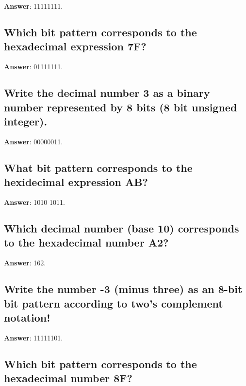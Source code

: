 \documentclass[a4paper,11pt,oneside]{article}
\begin{document}
\begin{sloppypar}
\label{q:358:sa:en:True}

\textbf{Answer}: 11111111.



\subsection{Which bit pattern corresponds to the hexadecimal expression 7F?}

\label{q:359:sa:en:True}

\textbf{Answer}: 01111111.



\subsection{Write the decimal number 3 as a binary number represented by 8 bits (8 bit unsigned integer).}

\label{q:360:sa:en:True}

\textbf{Answer}: 00000011.



\subsection{What bit pattern corresponds to the hexidecimal expression AB?}

\label{q:361:sa:en:True}

\textbf{Answer}: 1010 1011.



\subsection{Which decimal number (base 10) corresponds to the hexadecimal number  A2?}

\label{q:362:sa:en:True}

\textbf{Answer}: 162.



\subsection{Write the number -3 (minus three) as an 8-bit bit pattern according to two's complement notation!}

\label{q:363:sa:en:True}

\textbf{Answer}: 11111101.



\subsection{Which bit pattern corresponds to the hexadecimal number 8F?}


\end{sloppypar}
\end{document}
